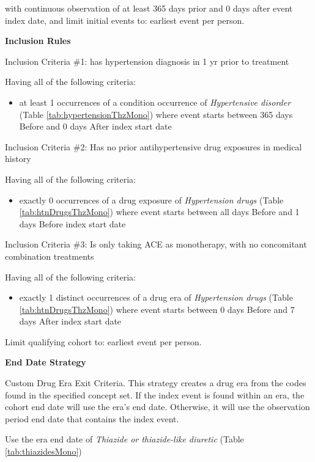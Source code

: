 \documentclass[11pt]{book}
\providecommand{\tightlist}{%
  \setlength{\itemsep}{0pt}\setlength{\parskip}{0pt}}
\theoremstyle{definition}
\theoremstyle{definition}
\theoremstyle{definition}
\theoremstyle{remark}
\begin{document}
with continuous observation of at least 365 days prior and 0 days after event index date, and limit initial events to: earliest event per person.

\textbf{Inclusion Rules}

Inclusion Criteria \#1: has hypertension diagnosis in 1 yr prior to treatment

Having all of the following criteria:

\begin{itemize}
\tightlist
\item
  at least 1 occurrences of a condition occurrence of \emph{Hypertensive disorder} (Table \ref{tab:hypertensionThzMono}) where event starts between 365 days Before and 0 days After index start date
\end{itemize}

Inclusion Criteria \#2: Has no prior antihypertensive drug exposures in medical history

Having all of the following criteria:

\begin{itemize}
\tightlist
\item
  exactly 0 occurrences of a drug exposure of \emph{Hypertension drugs} (Table \ref{tab:htnDrugsThzMono}) where event starts between all days Before and 1 days Before index start date
\end{itemize}

Inclusion Criteria \#3: Is only taking ACE as monotherapy, with no concomitant combination treatments

Having all of the following criteria:

\begin{itemize}
\tightlist
\item
  exactly 1 distinct occurrences of a drug era of \emph{Hypertension drugs} (Table \ref{tab:htnDrugsThzMono}) where event starts between 0 days Before and 7 days After index start date
\end{itemize}

Limit qualifying cohort to: earliest event per person.

\textbf{End Date Strategy}

Custom Drug Era Exit Criteria.
This strategy creates a drug era from the codes found in the specified concept set. If the index event is found within an era, the cohort end date will use the era's end date. Otherwise, it will use the observation period end date that contains the index event.

Use the era end date of \emph{Thiazide or thiazide-like diuretic} (Table \ref{tab:thiazidesMono})
\end{document}
